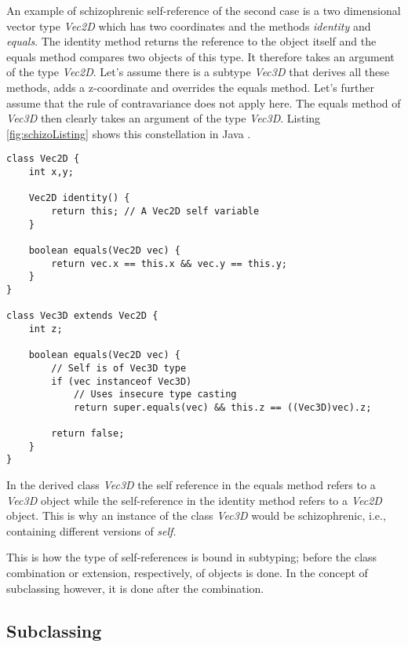 An example of schizophrenic self-reference of the second case is a two
dimensional vector type \emph{Vec2D} which has two coordinates and the
methods \emph{identity} and \emph{equals}. The identity method returns
the reference to the object itself and the equals method compares
two objects of this type. It therefore takes an argument of the type
\emph{Vec2D}. Let's assume there is a subtype \emph{Vec3D} that derives all
these methods, adds a z-coordinate and overrides the equals method. Let's
further assume that the rule of contravariance does not apply here. The
equals method of \emph{Vec3D} then clearly takes an argument of the type
\emph{Vec3D}. Listing \ref{fig:schizoListing} shows this constellation
in Java \cite{simons_theory_2003-2}.

\begin{lstlisting}[float=ht,caption={An example of schizophrenic self-reference},label={fig:schizoListing}]
class Vec2D {
	int x,y;

	Vec2D identity() {
		return this; // A Vec2D self variable
	}

	boolean equals(Vec2D vec) {
		return vec.x == this.x && vec.y == this.y;
	}
}

class Vec3D extends Vec2D {
	int z;

	boolean equals(Vec2D vec) {
		// Self is of Vec3D type
		if (vec instanceof Vec3D)
			// Uses insecure type casting
			return super.equals(vec) && this.z == ((Vec3D)vec).z;

		return false;
	}
}
\end{lstlisting}

In the derived class \emph{Vec3D} the self reference in the equals
method refers to a \emph{Vec3D} object while the self-reference in the identity method
refers to a \emph{Vec2D} object. This is why an instance of the class
\emph{Vec3D} would be schizophrenic, i.e., containing different versions
of \emph{self}.

This is how the type of self-references is bound in subtyping; before
the class combination or extension, respectively, of objects is done.
In the concept of subclassing however, it is done after the combination.

\subsection{Subclassing}

